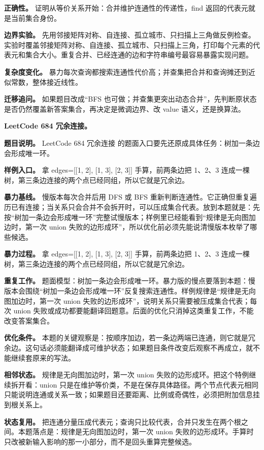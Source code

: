 \textbf{正确性。} 证明从等价关系开始：合并维护连通性的传递性，find 返回的代表元就是当前集合身份。

\textbf{边界实验。} 先用邻接矩阵对称、自连接、孤立城市、只扫描上三角做反例检查。实验时覆盖邻接矩阵对称、自连接、孤立城市、只扫描上三角，打印每个元素的代表元和集合大小。重复合并、已经连通的边和字符串编号最容易暴露实现问题。

\textbf{复杂度变化。} 暴力每次查询都搜索连通性代价高；并查集把合并和查询摊还到近似常数，整体接近线性。

\textbf{迁移追问。} 如果题目改成“BFS 也可做；并查集更突出动态合并”，先判断原状态是否仍然覆盖新答案集合，再决定是微调边界、改 value 语义，还是换算法。

\noindent\textbf{LeetCode 684 冗余连接。}

\textbf{题目说明。} LeetCode 684 冗余连接 的题面入口要先还原成具体任务：树加一条边会形成唯一环。

\textbf{样例入口。} 拿 edges=[[1, 2], [1, 3], [2, 3]] 手算，前两条边把 1、2、3 连成一棵树，第三条边连接的两个点已经同组，所以它就是冗余边。

\textbf{暴力基线。} 慢版本每次合并后用 DFS 或 BFS 重新判断连通性。它正确但重复遍历已有连接；当关系只会合并不会拆开时，可以压成集合代表。放到本题就是：先按“树加一条边会形成唯一环”完整试慢版本；样例里已经能看到“规律是无向图加边时，第一次 union 失败的边形成环”，所以优化前必须先能说清慢版本枚举了哪些候选。

\textbf{暴力过程。} 拿 edges=[[1, 2], [1, 3], [2, 3]] 手算，前两条边把 1、2、3 连成一棵树，第三条边连接的两个点已经同组，所以它就是冗余边。

\textbf{重复工作。} 题面模型：树加一条边会形成唯一环。暴力版的慢点要落到本题：慢版本会围绕“树加一条边会形成唯一环”反复搜索连通性。样例规律是“规律是无向图加边时，第一次 union 失败的边形成环”，说明关系只需要被压成集合代表；每次 union 失败或成功都要能翻译回题意。后面的优化只消掉这类重复工作，不能改变答案集合。

\textbf{优化条件。} 本题的关键观察是：按顺序加边，若一条边两端已连通，则它就是冗余边。这句话必须能翻译成可维护状态；如果题目条件改变后观察不再成立，就不能继续套原来的写法。

\textbf{相邻状态。} 规律是无向图加边时，第一次 union 失败的边形成环。把这个特例继续拆开看：union 只是在维护等价类，不是在保存具体路径。两个节点代表元相同只能说明连通或关系一致；如果题目还要距离、比例或奇偶性，必须把附加信息挂到根关系上。

\textbf{状态复用。} 把连通分量压成代表元；查询只比较代表，合并只发生在两个根之间。本题落点是：规律是无向图加边时，第一次 union 失败的边形成环。手算时只改被新输入影响的那一小部分，而不是回头重算完整候选。

